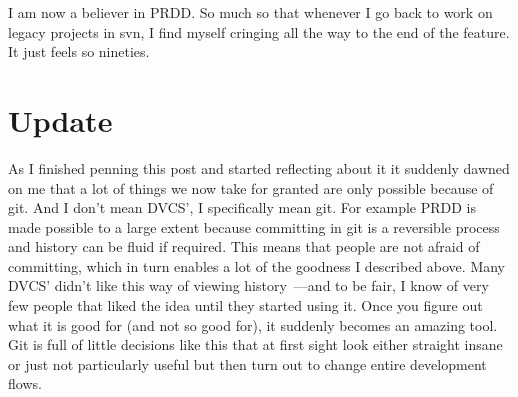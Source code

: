\documentclass{book}
\begin{document}
I am now a believer in PRDD. So much so that whenever I go back to
work on legacy projects in svn, I find myself cringing all the way to
the end of the feature. It just feels so nineties.

\section*{Update}

As I finished penning this post and started reflecting about it it
suddenly dawned on me that a lot of things we now take for granted are
only possible because of git. And I don't mean DVCS', I specifically
mean git. For example PRDD is made possible to a large extent because
committing in git is a reversible process and history can be fluid if
required. This means that people are not afraid of committing, which
in turn enables a lot of the goodness I described above. Many DVCS'
didn't like this way of viewing history~---and to be fair, I know of
very few people that liked the idea until they started using it. Once
you figure out what it is good for (and not so good for), it suddenly
becomes an amazing tool. Git is full of little decisions like this
that at first sight look either straight insane or just not
particularly useful but then turn out to change entire development
flows.



\end{document}
